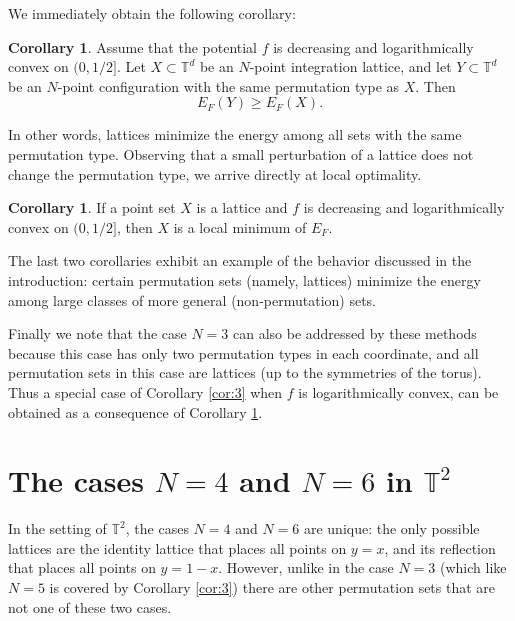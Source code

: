 \documentclass[a4paper,12pt]{article}
\numberwithin{equation}{section}
\theoremstyle{definition}
\newtheorem{cor}[thm]{Corollary}
\begin{document}
We immediately obtain the following corollary:

\begin{cor}\label{cor:lat_type}
Assume that the potential $f$ is decreasing and logarithmically convex on $(0,1/2]$. Let $X \subset \mathbb T^d$ be an $N$-point integration lattice, and let $Y \subset \mathbb T^d$ be an $N$-point configuration with the same permutation type as $X$. Then $$ E_F (Y) \ge E_F (X).$$
\end{cor}

In other words, lattices minimize the energy among all sets with the same permutation type. Observing that a  small perturbation of a lattice does not change the  permutation type, we arrive directly at local optimality. %

\begin{cor}\label{cor:lattice}
   If a point set $X$ is a lattice and $f$ is decreasing and logarithmically convex on $(0,1/2]$, then $X$ is a local minimum of $E_F$.
\end{cor}



The last two corollaries  exhibit an example of the behavior discussed in the introduction: certain permutation sets (namely, lattices) minimize the energy among large classes of more general (non-permutation) sets. 

Finally we note that the case  $N=3$ can also be addressed by these methods because this case has only two permutation types in each coordinate, and all permutation sets in this case are lattices (up to the symmetries of the torus). Thus a special case of  Corollary \ref{cor:3} when $f$ is logarithmically convex, can be obtained as a consequence of Corollary \ref{cor:lat_type}. %




\section{The cases $N=4$ and $N=6$ in $\mathbb{T}^2$}\label{sec:N4}

In the setting of $\mathbb{T}^2$, the cases $N=4$ and $N=6$ are unique: the only possible lattices are the identity lattice that places all points on $y=x$, and its reflection that places all points on $y=1-x$. However, unlike in the case $N=3$ (which like $N=5$ is covered by Corollary \ref{cor:3}) there are other permutation sets that are not one of these two cases. %
\end{document}
